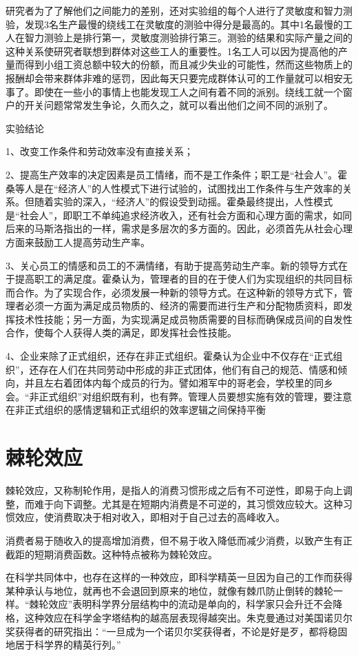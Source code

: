 \documentclass[11pt]{ctexart}
\begin{document}
研究者为了了解他们之间能力的差别，还对实验组的每个人进行了灵敏度和智力测验，发现3名生产最慢的绕线工在灵敏度的测验中得分是最高的。其中1名最慢的工人在智力测验上是排行第一，灵敏度测验排行第三。测验的结果和实际产量之间的这种关系使研究者联想到群体对这些工人的重要性。1名工人可以因为提高他的产量而得到小组工资总额中较大的份额，而且减少失业的可能性，然而这些物质上的报酬却会带来群体非难的惩罚，因此每天只要完成群体认可的工作量就可以相安无事了。即使在一些小的事情上也能发现工人之间有着不同的派别。绕线工就一个窗户的开关问题常常发生争论，久而久之，就可以看出他们之间不同的派别了。

实验结论

1、改变工作条件和劳动效率没有直接关系；

2、提高生产效率的决定因素是员工情绪，而不是工作条件；职工是“社会人”。霍桑等人是在“经济人”的人性模式下进行试验的，试图找出工作条件与生产效率的关系。但随着实验的深入，“经济人”的假设受到动摇。霍桑最终提出，人性模式是“社会人”，即职工不单纯追求经济收入，还有社会方面和心理方面的需求，如同后来的马斯洛指出的一样，需求是多层次的多方面的。因此，必须首先从社会心理方面来鼓励工人提高劳动生产率。

3、关心员工的情感和员工的不满情绪，有助于提高劳动生产率。新的领导方式在于提高职工的满足度。霍桑认为，管理者的目的在于使人们为实现组织的共同目标而合作。为了实现合作，必须发展一种新的领导方式。在这种新的领导方式下，管理者必须一方面为满足成员物质的、经济的需要而进行生产和分配物质资料，即发挥技术性技能；另一方面，为实现满足成员物质需要的目标而确保成员间的自发性合作，使每个人获得人类的满足，即发挥社会性技能。

4、企业来除了正式组织，还存在非正式组织。霍桑认为企业中不仅存在“正式组织”，还存在人们在共同劳动中形成的非正式团体，他们有自己的规范、情感和倾向，并且左右着团体内每个成员的行为。譬如湘军中的哥老会，学校里的同乡会。“非正式组织”对组织既有利，也有弊。管理人员要想实施有效的管理，要注意在非正式组织的感情逻辑和正式组织的效率逻辑之间保持平衡
\section{棘轮效应}
\label{sec-50}


棘轮效应，又称制轮作用，是指人的消费习惯形成之后有不可逆性，即易于向上调整，而难于向下调整。尤其是在短期内消费是不可逆的，其习惯效应较大。这种习惯效应，使消费取决于相对收入，即相对于自己过去的高峰收入。

消费者易于随收入的提高增加消费，但不易于收入降低而减少消费，以致产生有正截距的短期消费函数。这种特点被称为棘轮效应。

在科学共同体中，也存在这样的一种效应，即科学精英一旦因为自己的工作而获得某种承认与地位，就再也不会退回到原来的地位，就像有棘爪防止倒转的棘轮一样。“棘轮效应”表明科学界分层结构中的流动是单向的，科学家只会升迁不会降格，这种效应在科学金字塔结构的越高层表现得越突出。朱克曼通过对美国诺贝尔奖获得者的研究指出：“一旦成为一个诺贝尔奖获得者，不论是好是歹，都将稳固地居于科学界的精英行列。”
\end{document}
